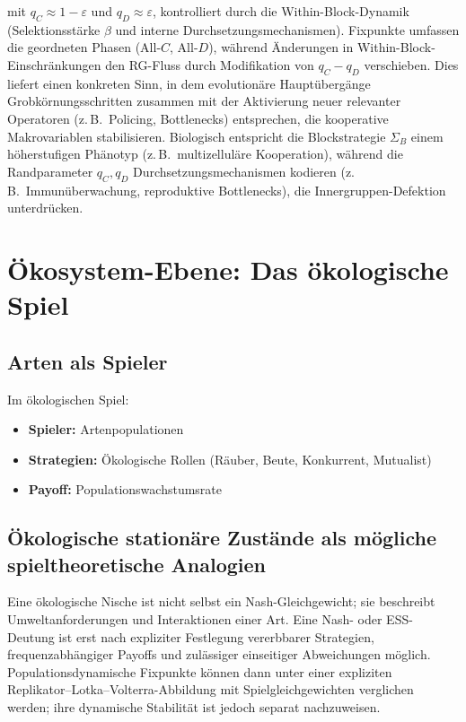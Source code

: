 \documentclass[12pt,a4paper]{article}
\theoremstyle{remark}
\begin{document}
mit $q_C\approx 1-\varepsilon$ und $q_D\approx \varepsilon$, kontrolliert durch die Within-Block-Dynamik (Selektionsstärke $\beta$ und interne Durchsetzungsmechanismen).
Fixpunkte umfassen die geordneten Phasen (All-$C$, All-$D$), während Änderungen in Within-Block-Einschränkungen den RG-Fluss durch Modifikation von $q_C-q_D$ verschieben.
Dies liefert einen konkreten Sinn, in dem evolutionäre Hauptübergänge Grobkörnungsschritten zusammen mit der Aktivierung neuer relevanter Operatoren (z.\,B.\ Policing, Bottlenecks) entsprechen, die kooperative Makrovariablen stabilisieren. Biologisch entspricht die Blockstrategie $\Sigma_B$ einem höherstufigen Phänotyp (z.\,B.\ multizelluläre Kooperation), während die Randparameter $q_C, q_D$ Durchsetzungsmechanismen kodieren (z.\,B.\ Immunüberwachung, reproduktive Bottlenecks), die Innergruppen-Defektion unterdrücken.

\section{Ökosystem-Ebene: Das ökologische Spiel}
\label{sec:ecosystem}

\subsection{Arten als Spieler}

Im ökologischen Spiel:
\begin{itemize}
    \item \textbf{Spieler:} Artenpopulationen
    \item \textbf{Strategien:} Ökologische Rollen (Räuber, Beute, Konkurrent, Mutualist)
    \item \textbf{Payoff:} Populationswachstumsrate
\end{itemize}

\subsection{Ökologische stationäre Zustände als mögliche spieltheoretische Analogien}

Eine ökologische Nische ist nicht selbst ein Nash-Gleichgewicht; sie beschreibt Umweltanforderungen und Interaktionen einer Art. Eine Nash- oder ESS-Deutung ist erst nach expliziter Festlegung vererbbarer Strategien, frequenzabhängiger Payoffs und zulässiger einseitiger Abweichungen möglich. Populationsdynamische Fixpunkte können dann unter einer expliziten Replikator--Lotka--Volterra-Abbildung mit Spielgleichgewichten verglichen werden; ihre dynamische Stabilität ist jedoch separat nachzuweisen.
\end{document}
